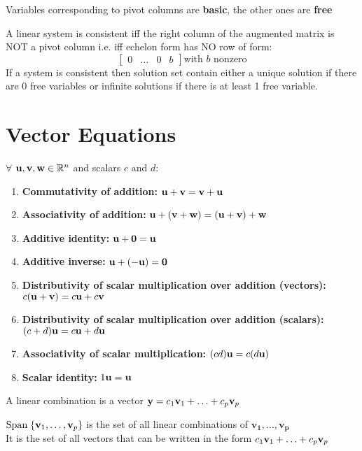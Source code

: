 \documentclass{report}
\begin{document}
Variables corresponding to pivot columns are \textbf{basic}, the other ones are \textbf{free}
\begin{theorem}
    
    A linear system is consistent iff the right column of the augmented matrix is NOT a pivot column
    i.e. iff echelon form has NO row of form:
    \[\begin{bmatrix}
        0 & \ldots & 0 & b
    \end{bmatrix} \text{with $b$ nonzero}
    \]
    If a system is consistent then solution set contain either a unique solution if there are 0 free variables
    or infinite solutions if there is at least 1 free variable.
\end{theorem}

\section{Vector Equations}
\begin{tcolorbox}[colback=blue!5!white, colframe=blue!75!black, title=Algebraic Properties of Vectors in $\Rn$]
$\forall$ $\mathbf{u}, \mathbf{v}, \mathbf{w} \in \mathbb{R}^n$ and scalars $c$ and $d$:
\begin{enumerate}
    \item \textbf{Commutativity of addition:} $\mathbf{u} + \mathbf{v} = \mathbf{v} + \mathbf{u}$
    \item \textbf{Associativity of addition:} $\mathbf{u} + (\mathbf{v} + \mathbf{w}) = (\mathbf{u} + \mathbf{v}) + \mathbf{w}$
    \item \textbf{Additive identity:} $\mathbf{u} + \mathbf{0} = \mathbf{u}$
    \item \textbf{Additive inverse:} $\mathbf{u} + (-\mathbf{u}) = \mathbf{0}$
    \item \textbf{Distributivity of scalar multiplication over addition (vectors):} $c(\mathbf{u} + \mathbf{v}) = c\mathbf{u} + c\mathbf{v}$
    \item \textbf{Distributivity of scalar multiplication over addition (scalars):} $(c + d)\mathbf{u} = c\mathbf{u} + d\mathbf{u}$
    \item \textbf{Associativity of scalar multiplication:} $(cd)\mathbf{u} = c(d\mathbf{u})$
    \item \textbf{Scalar identity:} $1 \mathbf{u} = \mathbf{u}$
\end{enumerate}
\end{tcolorbox}
    
A linear combination is a vector $\mathbf{y} = c_1\mathbf{v}_1 + \ldots + c_p\mathbf{v}_p$

\begin{definition}
    $\mathrm{Span}\;\{\mathbf{v}_1, \ldots, \mathbf{v}_p\}$ is the set of all linear combinations of $\mathbf{v_1}, \ldots, \mathbf{v_p}$
    \\It is the set of all vectors that can be written in the form $c_1\mathbf{v}_1 + \ldots + c_p\mathbf{v}_p$
\end{definition}
\end{document}
